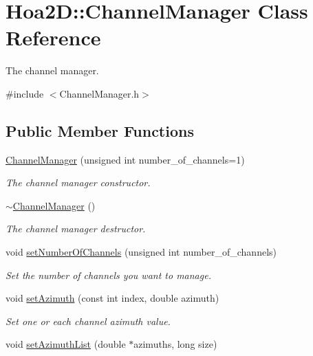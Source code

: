 \hypertarget{class_hoa2_d_1_1_channel_manager}{\section{Hoa2\-D\-:\-:Channel\-Manager Class Reference}
\label{class_hoa2_d_1_1_channel_manager}
}


The channel manager.  




{\ttfamily \#include $<$Channel\-Manager.\-h$>$}

\subsection*{Public Member Functions}
\begin{DoxyCompactItemize}
\item 
\hyperlink{class_hoa2_d_1_1_channel_manager_a3bd9f0fe607a6382e0f6db55c944949e}{Channel\-Manager} (unsigned int number\-\_\-of\-\_\-channels=1)
\begin{DoxyCompactList}\small\item\em The channel manager constructor. \end{DoxyCompactList}\item 
\hyperlink{class_hoa2_d_1_1_channel_manager_a1c39655db4a8238e79d688ed7453460d}{$\sim$\-Channel\-Manager} ()
\begin{DoxyCompactList}\small\item\em The channel manager destructor. \end{DoxyCompactList}\item 
void \hyperlink{class_hoa2_d_1_1_channel_manager_adb068e6cf5cd8e4213faad34a8b257b7}{set\-Number\-Of\-Channels} (unsigned int number\-\_\-of\-\_\-channels)
\begin{DoxyCompactList}\small\item\em Set the number of channels you want to manage. \end{DoxyCompactList}\item 
void \hyperlink{class_hoa2_d_1_1_channel_manager_a84b733f3204cc4f28368d7091fc1d6a2}{set\-Azimuth} (const int index, double azimuth)
\begin{DoxyCompactList}\small\item\em Set one or each channel azimuth value. \end{DoxyCompactList}\item 
void \hyperlink{class_hoa2_d_1_1_channel_manager_ae65af4a5c994967d7111c99e1bba637f}{set\-Azimuth\-List} (double $\ast$azimuths, long size)

\end{DoxyCompactItemize}
